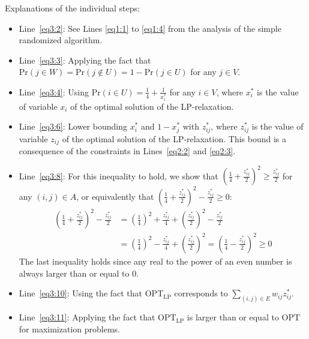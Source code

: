 \documentclass{article}
\begin{document}
Explanations of the individual steps:
\begin{itemize}
    \item Line~\ref{eq3:2}: See Lines \ref{eq1:1} to \ref{eq1:4} from the analysis of the simple randomized algorithm. 
    \item Line~\ref{eq3:3}: Applying the fact that $\text{Pr}(j \in W) = \text{Pr}(j \not \in U) = 1 - \text{Pr}(j \in U)$ for any $j \in V$.
    \item Line~\ref{eq3:4}: Using $\text{Pr}(i \in U) = \frac{1}{4} + \frac{1}{x_i^*}$ for any $i \in V$, where $x_i^*$ is the value of variable $x_i$ of the optimal solution of the LP-relaxation.
    \item Line~\ref{eq3:6}: Lower bounding $x_i^*$ and $1 - x_j^*$ with $z_{ij}^*$, where $z_{ij}^*$ is the value of variable $z_{ij}$ of the optimal solution of the LP-relaxation. This bound is a consequence of the constraints in Lines~\ref{eq2:2} and \ref{eq2:3}.
    \item Line~\ref{eq3:8}: For this inequality to hold, we show that $\left(\frac{1}{4} + \frac{z_{ij}^*}{2}\right)^2 \ge \frac{z_{ij}^*}{2}$ for any $(i,j) \in A$, or equivalently that $\left(\frac{1}{4} + \frac{z_{ij}^*}{2}\right)^2 - \frac{z_{ij}^*}{2} \ge 0$:
    \begin{align*}
        \left(\frac{1}{4} + \frac{z_{ij}^*}{2}\right)^2 - \frac{z_{ij}^*}{2} &= \left(\frac{1}{4}\right)^2 + \frac{z_{ij}^*}{4} + \left(\frac{z_{ij}^*}{2}\right)^2 - \frac{z_{ij}^*}{2}\\
        &= \left(\frac{1}{4}\right)^2 - \frac{z_{ij}^*}{4} + \left(\frac{z_{ij}^*}{2}\right)^2 = \left(\frac{1}{4} - \frac{z_{ij}^*}{2}\right)^2 \ge 0
    \end{align*}
    The last inequality holds since any real to the power of an even number is always larger than or equal to $0$. 
    \item Line~\ref{eq3:10}: Using the fact that $\text{OPT}_\text{LP}$ corresponds to $\sum_{(i,j) \in E} w_{ij} z_{ij}^*$.
    \item Line~\ref{eq3:11}: Applying the fact that $\text{OPT}_\text{LP}$ is larger than or equal to $\text{OPT}$ for maximization problems. 
    
\end{itemize}
\end{document}

